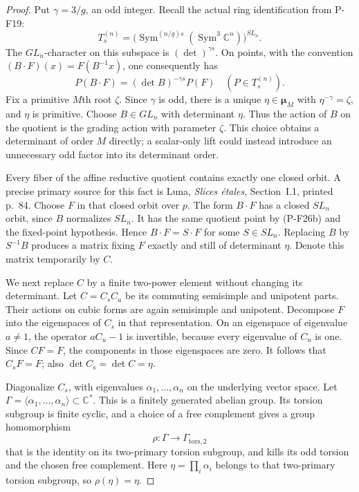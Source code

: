 \begin{proof}
Put $\gamma=3/g$, an odd integer. Recall the actual ring
identification from P-F19:
\[
 T^{(n)}_s=\bigl(\operatorname{Sym}^{(n/g)s}
                         (\operatorname{Sym}^3\mathbb C^n)\bigr)^{SL_n}.
\]
The $GL_n$-character on this subspace is $(\det)^{\gamma s}$.
On points, with the convention $(B\cdot F)(x)=F(B^{-1}x)$,
one consequently has
\[
 P(B\cdot F)=(\det B)^{-\gamma s}P(F)
       \quad(P\in T^{(n)}_s).
 \tag{P-F26b}
\]
Fix a primitive $M$th root $\zeta$. Since $\gamma$ is odd,
there is a unique $\eta\in\boldsymbol\mu_M$ with
$\eta^{-\gamma}=\zeta$, and $\eta$ is primitive. Choose
$B\in GL_n$ with determinant $\eta$. Thus the action of $B$
on the quotient is the grading action with parameter $\zeta$.
This choice obtains a determinant of order $M$ directly; a
scalar-only lift could instead introduce an unnecessary odd
factor into its determinant order.

Every fiber of the affine reductive quotient contains exactly
one closed orbit. A precise primary source for this fact is
Luna, \emph{Slices \'etales}, Section~I.1, printed p.~84.
Choose $F$ in that closed orbit over $p$. The form $B\cdot F$
has a closed $SL_n$ orbit, since $B$ normalizes $SL_n$.
It has the same quotient point by (P-F26b) and the fixed-point
hypothesis. Hence $B\cdot F=S\cdot F$ for some $S\in SL_n$.
Replacing $B$ by $S^{-1}B$ produces a matrix fixing $F$
exactly and still of determinant $\eta$. Denote this matrix
temporarily by $C$.

We next replace $C$ by a finite two-power element without
changing its determinant. Let $C=C_sC_u$ be its commuting
semisimple and unipotent parts. Their actions on cubic forms
are again semisimple and unipotent. Decompose $F$ into the
eigenspaces of $C_s$ in that representation. On an eigenspace
of eigenvalue $a\ne1$, the operator $aC_u-1$ is invertible,
because every eigenvalue of $C_u$ is one. Since $C F=F$,
the components in those eigenspaces are zero. It follows that
$C_sF=F$; also $\det C_s=\det C=\eta$.

Diagonalize $C_s$, with eigenvalues $\alpha_1,\ldots,\alpha_n$
on the underlying vector space. Let
$\Gamma=\langle\alpha_1,\ldots,\alpha_n\rangle\subset\mathbb C^*$.
This is a finitely generated abelian group. Its torsion
subgroup is finite cyclic, and a choice of a free complement
gives a group homomorphism
\[
 \rho:\Gamma\longrightarrow\Gamma_{\mathrm{tors},2}
\]
that is the identity on its two-primary torsion subgroup,
and kills its odd torsion and the chosen free complement.
Here $\eta=\prod_i\alpha_i$ belongs to that two-primary
torsion subgroup, so $\rho(\eta)=\eta$.


\end{proof}
